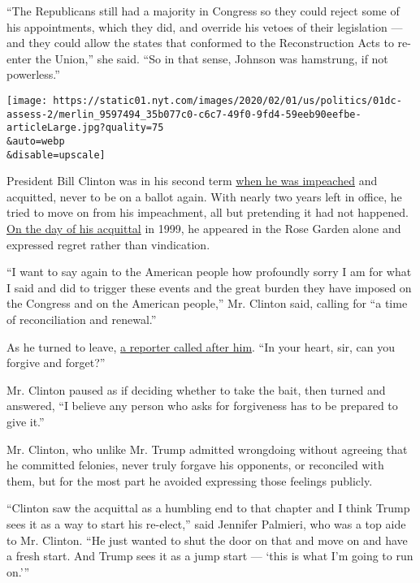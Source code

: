 ``The Republicans still had a majority in Congress so they could reject
some of his appointments, which they did, and override his vetoes of
their legislation --- and they could allow the states that conformed to
the Reconstruction Acts to re-enter the Union,'' she said. ``So in that
sense, Johnson was hamstrung, if not powerless.''

\texttt{[image: https://static01.nyt.com/images/2020/02/01/us/politics/01dc-assess-2/merlin\_9597494\_35b077c0-c6c7-49f0-9fd4-59eeb90eefbe-articleLarge.jpg?quality=75\\\&auto=webp\\\&disable=upscale]}

President Bill Clinton was in his second term
\href{https://www.washingtonpost.com/politics/clinton-impeachment/clinton-impeached-house-approves-articles-alleging-perjury-obstruction/}{when
he was impeached} and acquitted, never to be on a ballot again. With
nearly two years left in office, he tried to move on from his
impeachment, all but pretending it had not happened.
\href{https://www.washingtonpost.com/politics/clinton-impeachment/senate-acquits-president-clinton/}{On
the day of his acquittal} in 1999, he appeared in the Rose Garden alone
and expressed regret rather than vindication.

``I want to say again to the American people how profoundly sorry I am
for what I said and did to trigger these events and the great burden
they have imposed on the Congress and on the American people,'' Mr.
Clinton said, calling for ``a time of reconciliation and renewal.''

As he turned to leave,
\href{http://movies2.nytimes.com/library/politics/021399impeach-clinton-text.html}{a
reporter called after him}. ``In your heart, sir, can you forgive and
forget?''

Mr. Clinton paused as if deciding whether to take the bait, then turned
and answered, ``I believe any person who asks for forgiveness has to be
prepared to give it.''

Mr. Clinton, who unlike Mr. Trump admitted wrongdoing without agreeing
that he committed felonies, never truly forgave his opponents, or
reconciled with them, but for the most part he avoided expressing those
feelings publicly.

``Clinton saw the acquittal as a humbling end to that chapter and I
think Trump sees it as a way to start his re-elect,'' said Jennifer
Palmieri, who was a top aide to Mr. Clinton. ``He just wanted to shut
the door on that and move on and have a fresh start. And Trump sees it
as a jump start --- `this is what I'm going to run on.'''

